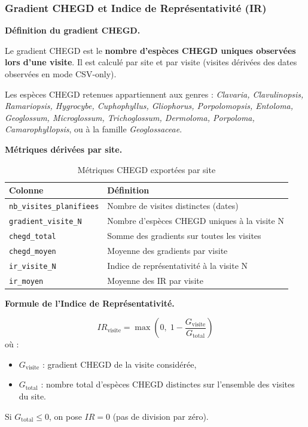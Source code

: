 \documentclass[11pt,a4paper]{article}
\begin{document}
\subsubsection{Gradient CHEGD et Indice de Représentativité (IR)}

\medskip
\noindent\textbf{Définition du gradient CHEGD.}\par

Le gradient CHEGD est le \textbf{nombre d'espèces CHEGD uniques observées lors d'une visite}.
Il est calculé par site et par visite (visites dérivées des dates observées en mode CSV-only).

Les espèces CHEGD retenues appartiennent aux genres :
\textit{Clavaria, Clavulinopsis, Ramariopsis, Hygrocybe, Cuphophyllus, Gliophorus,
Porpolomopsis, Entoloma, Geoglossum, Microglossum, Trichoglossum, Dermoloma, Porpoloma,
Camarophyllopsis}, ou à la famille \textit{Geoglossaceae}.

\medskip
\noindent\textbf{Métriques dérivées par site.}\par

\begin{table}[htbp]
  \centering
  \caption{Métriques CHEGD exportées par site}
  \begin{tabularx}{\textwidth}{lX}
    \toprule
    \textbf{Colonne} & \textbf{Définition} \\
    \midrule
    \texttt{nb\_visites\_planifiees} & Nombre de visites distinctes (dates) \\
    \texttt{gradient\_visite\_N}     & Nombre d'espèces CHEGD uniques à la visite N \\
    \texttt{chegd\_total}            & Somme des gradients sur toutes les visites \\
    \texttt{chegd\_moyen}            & Moyenne des gradients par visite \\
    \texttt{ir\_visite\_N}           & Indice de représentativité à la visite N \\
    \texttt{ir\_moyen}               & Moyenne des IR par visite \\
    \bottomrule
  \end{tabularx}
\end{table}

\medskip
\noindent\textbf{Formule de l'Indice de Représentativité.}\par

\begin{formulebox}
  \[
    IR_{\text{visite}} = \max\!\left(0,\; 1 - \frac{G_{\text{visite}}}{G_{\text{total}}}\right)
  \]
  où :
  \begin{itemize}
    \item $G_{\text{visite}}$ : gradient CHEGD de la visite considérée,
    \item $G_{\text{total}}$ : nombre total d'espèces CHEGD distinctes sur l'ensemble des visites du site.
  \end{itemize}
  Si $G_{\text{total}} \leq 0$, on pose $IR = 0$ (pas de division par zéro).
\end{formulebox}
\end{document}
